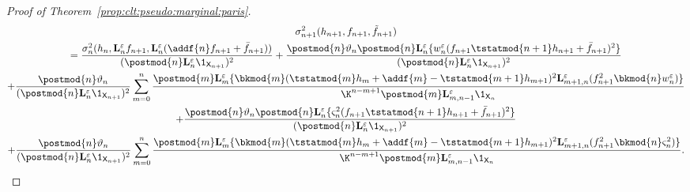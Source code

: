\begin{proof}[Proof of Theorem~\ref{prop:clt:pseudo:marginal:paris}]
\begin{multline} \label{eq:as:var:second:expression}
\sigma^2_{n + 1}(h_{n + 1}, f_{n + 1}, \ftd{n + 1}) \\
= \frac{\sigma^2_n(h_n, \ukmod{n} f_{n + 1}, \ukmod{n}(\addf{n} f_{n + 1} + \bar{f}_{n + 1}))}{(\postmod{n} \ukmod{n} \1_{\Xset_{n + 1}})^2}
+ \frac{\postmod{n} \adjfuncforward{n} \postmod{n} \ukmod{n} \{\wgtfuncmod{n}(f_{n + 1} \tstatmod{n + 1} h_{n + 1} + \bar{f}_{n + 1})^2 \}}{(\postmod{n} \ukmod{n} \1_{\Xset_{n + 1}})^2} \\
+ \frac{\postmod{n} \adjfuncforward{n}}{(\postmod{n} \ukmod{n} \1_{\Xset_{n + 1}})^2} \sum_{m = 0}^n \frac{\postmod{m} \ukmod{m}\{\bkmod{m}(\tstatmod{m} h_m + \addf{m} - \tstatmod{m + 1} h_{m + 1})^2 \ukmod{m + 1, n}(f_{n + 1}^2 \bkmod{n} \wgtfuncmod{n})\}}{\K^{n - m + 1} \postmod{m} \ukmod{m, n - 1} \1_{\Xset_n}} \\
+ \frac{\postmod{n} \adjfuncforward{n} \postmod{n} \ukmod{n} \{\ukestvar{n}(f_{n + 1} \tstatmod{n + 1} h_{n + 1} + \bar{f}_{n + 1})^2 \}}{(\postmod{n} \ukmod{n} \1_{\Xset_{n + 1}})^2} \\
+ \frac{\postmod{n} \adjfuncforward{n}}{(\postmod{n} \ukmod{n} \1_{\Xset_{n + 1}})^2} \sum_{m = 0}^n \frac{\postmod{m} \ukmod{m}\{\bkmod{m}(\tstatmod{m} h_m + \addf{m} - \tstatmod{m + 1} h_{m + 1})^2 \ukmod{m + 1, n}(f_{n + 1}^2 \bkmod{n} \ukestvar{n})\}}{\K^{n - m + 1} \postmod{m} \ukmod{m, n - 1} \1_{\Xset_n}}. 
\end{multline}


\end{proof}
